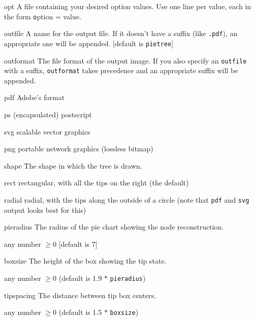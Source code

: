 \documentclass[10pt]{article}
\begin{document}
\begin{optdescrip}

	\item[opt] A file containing your desired option values.  Use one line per value, each in the form {\texttt option = value}.

	\item[outfile] A name for the output file.  If it doesn't have a suffix (like \texttt{.pdf}), an appropriate one will be appended. [default is \texttt{pietree}]

	\item[outformat] The file format of the output image.  If you also specify an \texttt{outfile} with a suffix, \texttt{outformat} takes precedence and an appropriate suffix will be appended.
		\begin{valdescrip}
			\item[pdf] Adobe's format
			\item[ps]  (encapsulated) postscript
			\item[svg] scalable vector graphics
			\item[png] portable network graphics (lossless bitmap)
		\end{valdescrip}

	\item[shape] The shape in which the tree is drawn.
		\begin{valdescrip}
			\item[rect] rectangular, with all the tips on the right (the default)
			\item[radial] radial, with the tips along the outside of a circle (note that \texttt{pdf} and \texttt{svg} output looks best for this)
		\end{valdescrip}

	\item[pieradius] The radius of the pie chart showing the node reconstruction.
		\begin{valdescrip}
			\item[] any number $\ge 0$ [default is 7]
		\end{valdescrip}

	\item[boxsize] The height of the box showing the tip state.
		\begin{valdescrip}
			\item[] any number $\ge 0$ (default is 1.9 $*$ \texttt{pieradius})
		\end{valdescrip}

	\item[tipspacing] The distance between tip box centers.
		\begin{valdescrip}
			\item[] any number $\ge 0$ (default is 1.5 $*$ \texttt{boxsize})
		\end{valdescrip}


\end{optdescrip}
\end{document}
